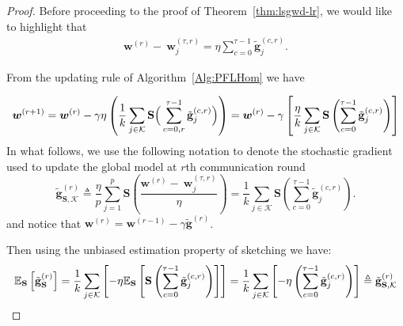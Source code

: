 \documentclass{article}
\begin{document}
\begin{proof}
Before proceeding to the proof of Theorem~\ref{thm:lsgwd-lr}, we would like to highlight that 
\begin{align}
    \boldsymbol{w}^{(r)}- ~{\boldsymbol{w}}_{j}^{(\tau,r)}=\eta\sum_{c=0}^{\tau-1}\tilde{\mathbf{g}}_j^{(c,r)}.\label{eq:decent-smoothe}
\end{align}

From the updating rule of Algorithm~\ref{Alg:PFLHom} we have

{
\begin{align}\notag
     {\boldsymbol{w}}^{(r+1)}=\boldsymbol{w}^{(r)}-\gamma\eta\left(\frac{1}{k}\sum_{j\in\mathcal{K}}\mathbf{S}\Big(\sum_{c=0,r}^{\tau-1}\tilde{\mathbf{g}}_{j}^{(c,r)}\Big)\right)=\boldsymbol{w}^{(r)}-\gamma\left[\frac{\eta}{k}\sum_{j\in\mathcal{K}}\mathbf{S}\left(\sum_{c=0}^{\tau-1}\tilde{\mathbf{g}}_{j}^{(c,r)}\right)\right]
\end{align}
}
In what follows, we use the following notation to denote the stochastic gradient used to update the global model at $r$th communication round $$\tilde{\mathbf{g}}_{\mathbf{S},\mathcal{K}}^{(r)}\triangleq\frac{\eta}{p}\sum_{j=1}^{p}\mathbf{S}\left(\frac{\boldsymbol{w}^{(r)}- ~{\boldsymbol{w}}_{j}^{(\tau,r)}}{\eta}\right)=\frac{1}{k}\sum_{j\in\mathcal{K}}\mathbf{S}\left(\sum_{c=0}^{\tau-1}\tilde{\mathbf{g}}_j^{(c,r)}\right).$$ 
and notice that $\boldsymbol{w}^{(r)} = \boldsymbol{w}^{(r-1)} - \gamma \tilde{\mathbf{g}}^{(r)}$.


Then using the unbiased estimation property of sketching we have:
\begin{align}\notag
  \mathbb{E}_\mathbf{S}\left[\tilde{\mathbf{g}}_\mathbf{S}^{(r)}\right]=\frac{1}{k}\sum_{j\in\mathcal{K}}\left[-\eta\mathbb{E}_\mathbf{S}\left[ \mathbf{S}\left(\sum_{c=0}^{\tau-1}\tilde{\mathbf{g}}_j^{(c,r)}\right)\right]\right]=\frac{1}{k}\sum_{j\in\mathcal{K}}\left[-\eta\left(\sum_{c=0}^{\tau-1}\tilde{\mathbf{g}}_j^{(c,r)}\right)\right]\triangleq \tilde{\mathbf{g}}_{\mathbf{S},\mathcal{K}}^{(r)}
\end{align}






\end{proof}
\end{document}
